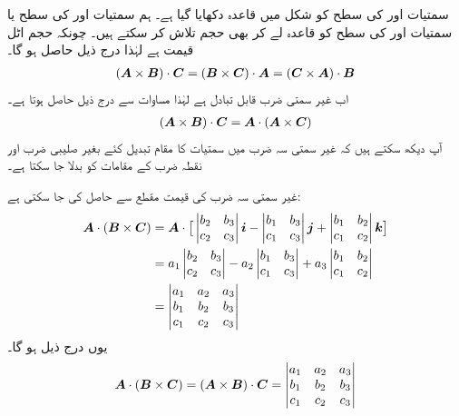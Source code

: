 سمتیات  اور  کی سطح کو شکل  میں قاعدہ دکھایا گیا ہے۔ ہم
سمتیات  اور  کی سطح یا  سمتیات  اور  کی سطح کو قاعدہ لے کر بھی حجم تلاش کر سکتے ہیں۔ چونکہ حجم اٹل قیمت ہے لہٰذا درج ذیل حاصل ہو گا۔
\begin{align}\label{مساوات_سمتیہ_حجم_کی_مساوات}
({{\boldsymbol{A}}}\times{\ensuremath{{\boldsymbol{B}}}})\cdot{\ensuremath{{\boldsymbol{C}}}}=({{\boldsymbol{B}}}\times{\ensuremath{{\boldsymbol{C}}}})\cdot{\ensuremath{{\boldsymbol{A}}}}=({{\boldsymbol{C}}}\times{\ensuremath{{\boldsymbol{A}}}})\cdot{\ensuremath{{\boldsymbol{B}}}}
\end{align}
اب غیر سمتی ضرب قابل تبادل ہے لہٰذا مساوات  سے درج ذیل حاصل ہوتا ہے۔
\begin{align}
({{\boldsymbol{A}}}\times{\ensuremath{{\boldsymbol{B}}}})\cdot{\ensuremath{{\boldsymbol{C}}}}={{\boldsymbol{A}}}\cdot({{\boldsymbol{A}}}\times{\ensuremath{{\boldsymbol{C}}}})
\end{align}
آپ دیکھ سکتے ہیں کہ غیر سمتی سہ ضرب میں سمتیات کا مقام تبدیل کئے بغیر صلیبی ضرب اور نقطہ ضرب کے مقامات کو بدلا جا سکتا ہے۔

غیر سمتی سہ ضرب کی قیمت مقطع سے حاصل کی جا سکتی ہے:
\begin{align*}
{\ensuremath{{\boldsymbol{A}}}}\cdot({{\boldsymbol{B}}}\times{\ensuremath{{\boldsymbol{C}}}})&={{\boldsymbol{A}}}\cdot\big[ \begin{vmatrix}  b_2&b_3\\c_2&c_3\end{vmatrix}{\boldsymbol{i}}-\begin{vmatrix}b_1&b_3\\c_1&c_3\end{vmatrix}{\boldsymbol{j}}+\begin{vmatrix}b_1&b_2\\c_1&c_2\end{vmatrix}{\boldsymbol{k}}\big]\\
&=a_1\begin{vmatrix}  b_2&b_3\\c_2&c_3\end{vmatrix}-a_2\begin{vmatrix}b_1&b_3\\c_1&c_3\end{vmatrix}+a_3\begin{vmatrix}b_1&b_2\\c_1&c_2\end{vmatrix}\\
&=\begin{vmatrix}a_1&a_2&a_3\\b_1&b_2&b_3\\c_1&c_2&c_3\end{vmatrix}
\end{align*}
یوں درج ذیل ہو گا۔
\begin{align}
{\ensuremath{{\boldsymbol{A}}}}\cdot({{\boldsymbol{B}}}\times{\ensuremath{{\boldsymbol{C}}}})=({{\boldsymbol{A}}}\times{\ensuremath{{\boldsymbol{B}}}})\cdot{\ensuremath{{\boldsymbol{C}}}}=\begin{vmatrix}a_1&a_2&a_3\\b_1&b_2&b_3\\c_1&c_2&c_3\end{vmatrix}
\end{align}

